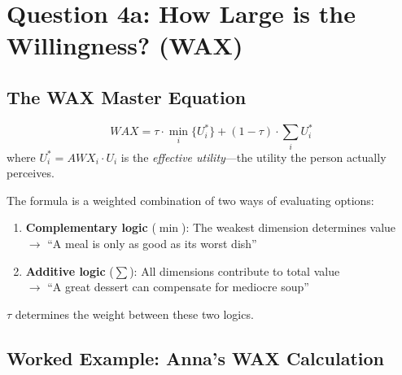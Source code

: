 \section{Question 4a: How Large is the Willingness? (WAX)}
\label{sec:12-wax}


\subsection{The WAX Master Equation}

\begin{definition}
\begin{equation}
WAX = \tau \cdot \min_i\{U_i^*\} + (1-\tau) \cdot \sum_i U_i^*
\label{eq:wax-master}
\end{equation}
where $U_i^* = AWX_i \cdot U_i$ is the \textit{effective utility}---the utility
the person actually perceives.
\end{definition}

\begin{intuition}
The formula is a weighted combination of two ways of evaluating options:

\begin{enumerate}
\item \textbf{Complementary logic} ($\min$): The weakest dimension determines value\\
$\rightarrow$ ``A meal is only as good as its worst dish''

\item \textbf{Additive logic} ($\sum$): All dimensions contribute to total value\\
$\rightarrow$ ``A great dessert can compensate for mediocre soup''
\end{enumerate}

$\tau$ determines the weight between these two logics.
\end{intuition}

\subsection{Worked Example: Anna's WAX Calculation}

